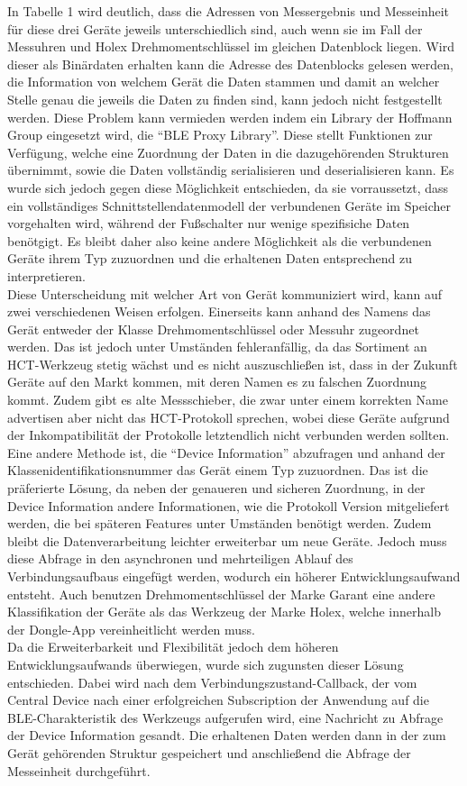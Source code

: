 In Tabelle 1 wird deutlich, dass die Adressen von Messergebnis und Messeinheit für diese drei Geräte jeweils unterschiedlich sind, auch wenn sie im Fall der Messuhren und Holex Drehmomentschlüssel im gleichen Datenblock liegen. Wird dieser als Binärdaten erhalten kann die Adresse des Datenblocks gelesen werden, die Information von welchem Gerät die Daten stammen und damit an welcher Stelle genau die jeweils die Daten zu finden sind, kann jedoch nicht festgestellt werden. Diese Problem kann vermieden werden indem ein Library der Hoffmann Group eingesetzt wird, die ``BLE Proxy Library''. Diese stellt Funktionen zur Verfügung, welche eine Zuordnung der Daten in die dazugehörenden Strukturen übernimmt, sowie die Daten vollständig serialisieren und deserialisieren kann. Es wurde sich jedoch gegen diese Möglichkeit entschieden, da sie vorraussetzt, dass ein vollständiges Schnittstellendatenmodell der verbundenen Geräte im Speicher vorgehalten wird, während der Fußschalter nur wenige spezifisiche Daten benötgigt. Es bleibt daher also keine andere Möglichkeit als die verbundenen Geräte ihrem Typ zuzuordnen und die erhaltenen Daten entsprechend zu interpretieren.\\
Diese Unterscheidung mit welcher Art von Gerät kommuniziert wird, kann auf zwei verschiedenen Weisen erfolgen. Einerseits kann anhand des Namens das Gerät entweder der Klasse Drehmomentschlüssel oder Messuhr zugeordnet werden. Das ist jedoch unter Umständen fehleranfällig, da das Sortiment an \ac{HCT}-Werkzeug stetig wächst und es nicht auszuschließen ist, dass in der Zukunft Geräte auf den Markt kommen, mit deren Namen es zu falschen Zuordnung kommt. Zudem gibt es alte Messschieber, die zwar unter einem korrekten Name advertisen aber nicht das \ac{HCT}-Protokoll sprechen, wobei diese Geräte aufgrund der Inkompatibilität der Protokolle letztendlich nicht verbunden werden sollten.\\
Eine andere Methode ist, die ``Device Information'' abzufragen und anhand der Klassenidentifikationsnummer das Gerät einem Typ zuzuordnen. Das ist die präferierte Lösung, da neben der genaueren und sicheren Zuordnung, in der Device Information andere Informationen, wie die Protokoll Version mitgeliefert werden, die bei späteren Features unter Umständen benötigt werden. Zudem bleibt die Datenverarbeitung leichter erweiterbar um neue Geräte. Jedoch muss diese Abfrage in den asynchronen und mehrteiligen Ablauf des Verbindungsaufbaus eingefügt werden, wodurch ein höherer Entwicklungsaufwand entsteht. Auch benutzen Drehmomentschlüssel der Marke Garant eine andere Klassifikation der Geräte als das Werkzeug der Marke Holex, welche innerhalb der Dongle-App vereinheitlicht werden muss.\\
Da die Erweiterbarkeit und Flexibilität jedoch dem höheren Entwicklungsaufwands überwiegen, wurde sich zugunsten dieser Lösung entschieden. Dabei wird nach dem Verbindungszustand-Callback, der vom Central Device nach einer erfolgreichen Subscription der Anwendung auf die \ac{BLE}-Charakteristik des Werkzeugs aufgerufen wird, eine Nachricht zu Abfrage der Device Information gesandt. Die erhaltenen Daten werden dann in der zum Gerät gehörenden Struktur gespeichert und anschließend die Abfrage der Messeinheit durchgeführt. 

